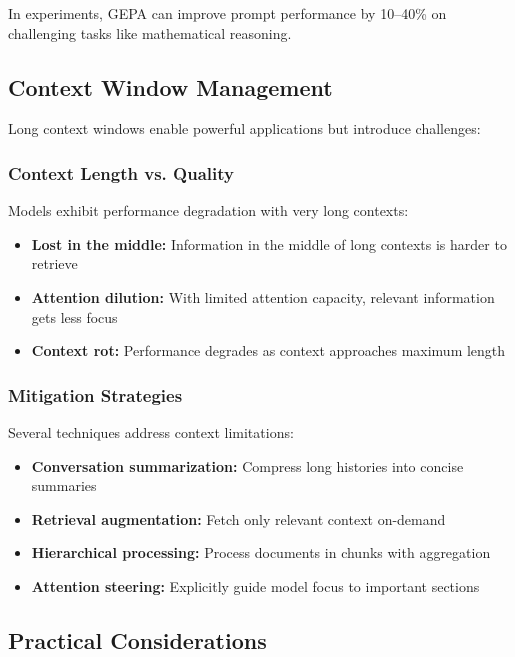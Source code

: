 \documentclass[class=article,crop=false]{standalone}
\begin{document}
In experiments, GEPA can improve prompt performance by 10--40\% on challenging tasks like mathematical reasoning.

\subsection{Context Window Management}
\label{sec:inference:context}

Long context windows enable powerful applications but introduce challenges:

\subsubsection{Context Length vs. Quality}

Models exhibit performance degradation with very long contexts:
\begin{itemize}
  \item \textbf{Lost in the middle:} Information in the middle of long contexts is harder to retrieve
  \item \textbf{Attention dilution:} With limited attention capacity, relevant information gets less focus
  \item \textbf{Context rot:} Performance degrades as context approaches maximum length
\end{itemize}

\subsubsection{Mitigation Strategies}

Several techniques address context limitations:
\begin{itemize}
  \item \textbf{Conversation summarization:} Compress long histories into concise summaries
  \item \textbf{Retrieval augmentation:} Fetch only relevant context on-demand
  \item \textbf{Hierarchical processing:} Process documents in chunks with aggregation
  \item \textbf{Attention steering:} Explicitly guide model focus to important sections
\end{itemize}

\subsection{Practical Considerations}
\label{sec:inference:practical}
\end{document}
